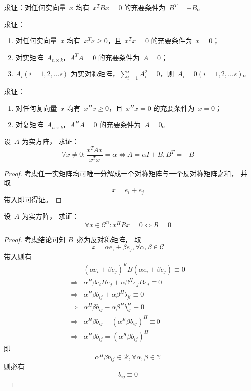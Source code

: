 \documentclass[twoside,openright]{book}
\begin{document}
\begin{CJK*}{UTF8}{}
\begin{quest}
\label{quest:13}
求证：对任何实向量\ $x$ 均有\ $x^TBx=0$ 的充要条件为\ $B^T=-B$。
\end{quest}

\begin{quest}
\label{quest:14}
求证：
\begin{enumerate}
\item
对任何实向量\ $x$ 均有\ $x^Tx\geq 0$，且\ $x^Tx=0$ 的充要条件为\ $x=0$；
\item
对实矩阵\ $A_{n\times k}$，$A^TA=0$ 的充要条件为\ $A=0$；
\item
$A_i(i=1,2,\dotsc s)$ 为实对称矩阵，$\sum^s_{i=1}A^2_i=0$，则\ $A_i=0(i=1,2,\dotsc s)$。
\end{enumerate}
\end{quest}

\begin{quest}
\label{quest:15}
求证：
\begin{enumerate}
\item
对任何复向量\ $x$ 均有\ $x^Hx\geq 0$，且\ $x^Hx=0$ 的充要条件为\ $x=0$；
\item
对复矩阵\ $A_{n\times k}$，$A^HA=0$ 的充要条件为\ $A=0$。
\end{enumerate}
\end{quest}

\begin{quest}
\label{quest:16}
设\ $A$ 为实方阵，
求证：
\[
\forall x \neq 0: \frac{x^TAx}{x^Tx}=\alpha
\Longleftrightarrow
A=\alpha I+B, B^T=-B
\]
\end{quest}
\begin{proof}
考虑任一实矩阵均可唯一分解成一个对称矩阵与一个反对称矩阵之和，
并取
\[
x=e_i + e_j
\]
带入即可得证。
\end{proof}

\begin{quest}
\label{quest:17}
设\ $A$ 为实方阵，
求证：
\[
\forall x \in \mathcal{C}^n: x^HBx=0
\Longleftrightarrow
B=0
\]
\end{quest}
\begin{proof}
考虑{}结论可知 $B$\ 必为反对称矩阵，
取
\[
x=\alpha e_i + \beta e_j, \forall \alpha, \beta \in \mathcal{C}
\]
带入则有
\[
\begin{split}
&
(\alpha e_i + \beta e_j)^H B (\alpha e_i + \beta e_j) \equiv 0 \\
\Rightarrow &
\alpha^H \beta e_i B e_j + \alpha \beta^H e_j B e_i \equiv 0 \\
\Rightarrow &
\alpha^H \beta b_{ij} + \alpha \beta^H b_{ji} \equiv 0 \\
\Rightarrow &
\alpha^H \beta b_{ij} - \alpha \beta^H b_{ij}^H \equiv 0 \\
\Rightarrow &
\alpha^H \beta b_{ij} - (\alpha^H \beta b_{ij})^H \equiv 0 \\
\Rightarrow &
\alpha^H \beta b_{ij} = (\alpha^H \beta b_{ij})^H
\end{split}
\]
即
\[
\alpha^H \beta b_{ij} \in \mathcal{R}, \forall \alpha, \beta \in \mathcal{C}
\]
则必有
\[
b_{ij} \equiv 0
\]
\end{proof}


\end{CJK*}
\end{document}
